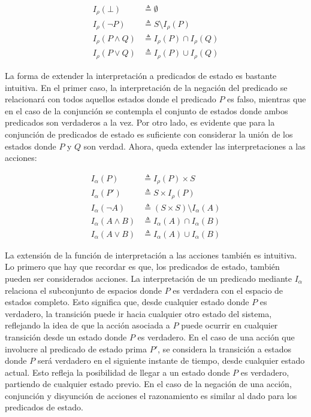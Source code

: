 \begin{align*}
    I_\rho(\bot) &\triangleq \emptyset  \\
    I_\rho(\neg P) &\triangleq S \setminus I_\rho(P) \\
    I_\rho(P \land Q) &\triangleq I_\rho(P) \cap I_\rho(Q) \\
    I_\rho(P \lor Q) &\triangleq I_\rho(P) \cup I_\rho(Q)
\end{align*}

La forma de extender la interpretación a predicados de estado es bastante intuitiva. En el primer caso, la interpretación de la negación del predicado se relacionará con todos aquellos estados donde el predicado $P$ es falso, mientras que en el caso de la conjunción se contempla el conjunto de estados donde ambos predicados son verdaderos a la vez. Por otro lado, es evidente que para la conjunción de predicados de estado es suficiente con considerar la unión de los estados donde $P$ y $Q$ son verdad. Ahora, queda extender las interpretaciones a las acciones:


\begin{align*}
    I_\alpha(P) &\triangleq I_\rho(P) \times S \\
    I_\alpha(P') &\triangleq S \times I_\rho(P) \\
    I_\alpha(\neg A) &\triangleq (S \times S) \setminus I_\alpha(A) \\
    I_\alpha(A \land B) &\triangleq I_\alpha(A) \cap I_\alpha(B) \\
    I_\alpha(A \lor B) &\triangleq I_\alpha(A) \cup I_\alpha(B)
\end{align*}

La extensión de la función de interpretación a las acciones también es intuitiva. Lo primero que hay que recordar es que, los predicados de estado, también pueden ser considerados acciones. La interpretación de un predicado mediante $I_\alpha$ relaciona el subconjunto de espacios donde $P$ es verdadera con el espacio de estados completo. Esto significa que, desde cualquier estado donde $P$ es verdadero, la transición puede ir hacia cualquier otro estado del sistema, reflejando la idea de que la acción asociada a $P$ puede ocurrir en cualquier transición desde un estado donde $P$ es verdadero. En el caso de una acción que involucre al predicado de estado prima $P'$,  se considera la transición a estados donde $P$ será verdadero en el siguiente instante de tiempo, desde cualquier estado actual. Esto refleja la posibilidad de llegar a un estado donde $P$ es verdadero, partiendo de cualquier estado previo. En el caso de la negación de una acción, conjunción y disyunción de acciones el razonamiento es similar al dado para los predicados de estado.

